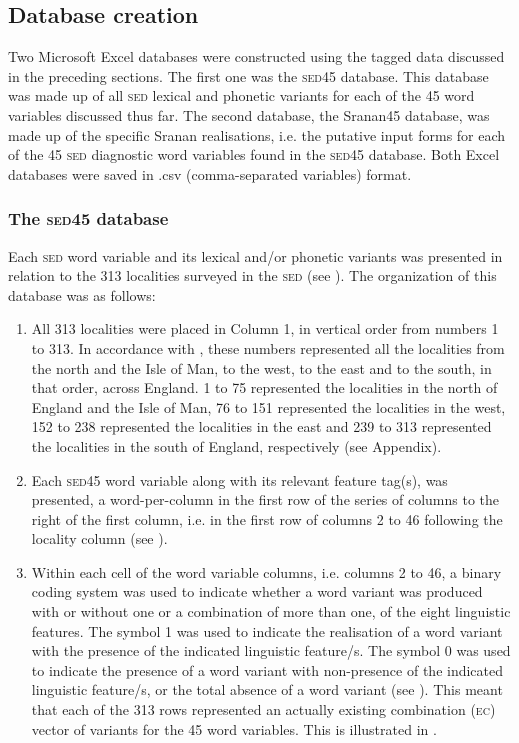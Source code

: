 {{{{{{{{{\subsection{Database creation}
Two Microsoft Excel databases were constructed using the tagged data discussed in the preceding sections. The first one was the \textsc{sed45} database. This database was made up of all \textsc{sed} lexical and phonetic variants for each of the 45 word variables discussed thus far. The second database, the Sranan45 database, was made up of the specific Sranan realisations, i.e. the putative input forms for each of the 45 \textsc{sed} diagnostic word variables found in the \textsc{sed45} database. Both Excel databases were saved in .csv (comma-separated variables) format.

\subsubsection{The \textsc{sed45} database}
Each \textsc{sed} word variable and its lexical and/or phonetic variants was presented in relation to the 313 localities surveyed in the \textsc{sed} (see ). The organization of this database was as follows:

\begin{enumerate}
\item {All 313 localities were placed in Column 1, in vertical order from numbers 1 to 313. In accordance with \citet{Orton6271}, these numbers represented all the localities from the north and the Isle of Man, to the west, to the east and to the south, in that order, across England. 1 to 75 represented the localities in the north of England and the Isle of Man, 76 to 151 represented the localities in the west, 152 to 238 represented the localities in the east and 239 to 313 represented the localities in the south of England, respectively (see Appendix).}
\item {Each \textsc{sed45} word variable along with its relevant feature tag(s), was presented, a word-per-column in the first row of the series of columns to the right of the first column, i.e. in the first row of columns 2 to 46 following the locality column (see ).}
\item {Within each cell of the word variable columns, i.e. columns 2 to 46, a binary coding system was used to indicate whether a word variant was produced with or without one or a combination of more than one, of the eight linguistic features. The symbol 1 was used to indicate the realisation of a word variant with the presence of the indicated linguistic feature/s. The symbol 0 was used to indicate the presence of a word variant with non-presence of the indicated linguistic feature/s, or the total absence of a word variant (see ). This meant that each of the 313 rows represented an actually existing combination (\textsc{ec}) vector of variants for the 45 word variables. This is illustrated in .}
\end{enumerate}

}}}}}}}}}
